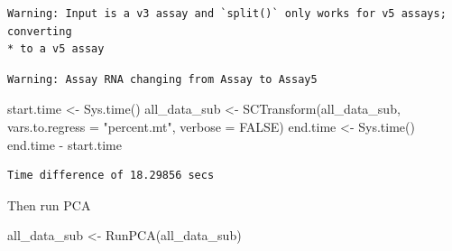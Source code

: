 \documentclass[
  letterpaper,
  DIV=11,
  numbers=noendperiod]{scrreprt}
\newenvironment{Shaded}{\begin{snugshade}}{\end{snugshade}}
\newcommand{\AttributeTok}[1]{\textcolor[rgb]{0.40,0.45,0.13}{#1}}
\newcommand{\ConstantTok}[1]{\textcolor[rgb]{0.56,0.35,0.01}{#1}}
\newcommand{\FunctionTok}[1]{\textcolor[rgb]{0.28,0.35,0.67}{#1}}
\newcommand{\NormalTok}[1]{\textcolor[rgb]{0.00,0.23,0.31}{#1}}
\newcommand{\OtherTok}[1]{\textcolor[rgb]{0.00,0.23,0.31}{#1}}
\newcommand{\SpecialCharTok}[1]{\textcolor[rgb]{0.37,0.37,0.37}{#1}}
\newcommand{\StringTok}[1]{\textcolor[rgb]{0.13,0.47,0.30}{#1}}
\begin{document}
\begin{Shaded}
\end{Shaded}

\begin{verbatim}
Warning: Input is a v3 assay and `split()` only works for v5 assays; converting
* to a v5 assay
\end{verbatim}

\begin{verbatim}
Warning: Assay RNA changing from Assay to Assay5
\end{verbatim}

\begin{Shaded}
\begin{Highlighting}[]
\NormalTok{start.time }\OtherTok{\textless{}{-}} \FunctionTok{Sys.time}\NormalTok{()}
\NormalTok{all\_data\_sub }\OtherTok{\textless{}{-}} \FunctionTok{SCTransform}\NormalTok{(all\_data\_sub, }\AttributeTok{vars.to.regress =} \StringTok{"percent.mt"}\NormalTok{, }\AttributeTok{verbose =} \ConstantTok{FALSE}\NormalTok{)}
\NormalTok{end.time }\OtherTok{\textless{}{-}} \FunctionTok{Sys.time}\NormalTok{()}
\NormalTok{end.time }\SpecialCharTok{{-}}\NormalTok{ start.time}
\end{Highlighting}
\end{Shaded}

\begin{verbatim}
Time difference of 18.29856 secs
\end{verbatim}

Then run PCA

\begin{Shaded}
\begin{Highlighting}[]
\NormalTok{all\_data\_sub }\OtherTok{\textless{}{-}} \FunctionTok{RunPCA}\NormalTok{(all\_data\_sub)}
\end{Highlighting}
\end{Shaded}
\end{document}
